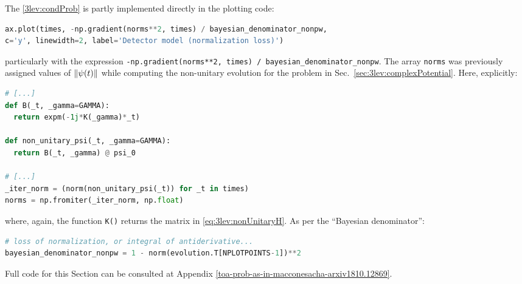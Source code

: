 The \eqref{3lev:condProb} is partly implemented
directly in the plotting code:
\begin{lstlisting}[language=Python]
ax.plot(times, -np.gradient(norms**2, times) / bayesian_denominator_nonpw,
c='y', linewidth=2, label='Detector model (normalization loss)')
\end{lstlisting}
particularly with the expression
\lstinline{-np.gradient(norms**2, times) / bayesian_denominator_nonpw}.
The array \Verb!norms! was previously assigned values of $\norm{\psi(t)}$
while computing the non-unitary evolution for the problem in Sec.~\ref{sec:3lev:complexPotential}.
Here, explicitly:
\begin{lstlisting}[language=Python]
# [...]
def B(_t, _gamma=GAMMA):
  return expm(-1j*K(_gamma)*_t)

def non_unitary_psi(_t, _gamma=GAMMA):
  return B(_t, _gamma) @ psi_0

# [...]
_iter_norm = (norm(non_unitary_psi(_t)) for _t in times)
norms = np.fromiter(_iter_norm, np.float)
\end{lstlisting}
where, again, the function \Verb!K()! returns the matrix in \eqref{eq:3lev:nonUnitaryH}.
As per the ``Bayesian denominator'':
\begin{lstlisting}[language=Python]
# loss of normalization, or integral of antiderivative...
bayesian_denominator_nonpw = 1 - norm(evolution.T[NPLOTPOINTS-1])**2
\end{lstlisting}

Full code for this Section can be consulted at Appendix \ref{toa-prob-as-in-macconesacha-arxiv1810.12869}.

